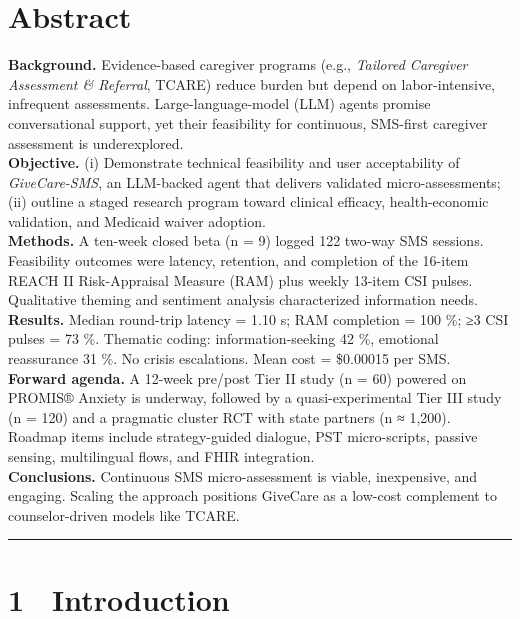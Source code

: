 \section{Abstract}\label{abstract}

\textbf{Background.} Evidence-based caregiver programs (e.g.,
\emph{Tailored Caregiver Assessment \& Referral}, TCARE) reduce burden
but depend on labor-intensive, infrequent assessments.
Large-language-model (LLM) agents promise conversational support, yet
their feasibility for continuous, SMS-first caregiver assessment is
underexplored.\\
\textbf{Objective.} (i) Demonstrate technical feasibility and user
acceptability of \emph{GiveCare-SMS}, an LLM-backed agent that delivers
validated micro-assessments; (ii) outline a staged research program
toward clinical efficacy, health-economic validation, and Medicaid
waiver adoption.\\
\textbf{Methods.} A ten-week closed beta (n = 9) logged 122 two-way SMS
sessions. Feasibility outcomes were latency, retention, and completion
of the 16-item REACH II Risk-Appraisal Measure (RAM) plus weekly 13-item
CSI pulses. Qualitative theming and sentiment analysis characterized
information needs.\\
\textbf{Results.} Median round-trip latency = 1.10 s; RAM completion =
100 \%; ≥3 CSI pulses = 73 \%. Thematic coding: information-seeking 42
\%, emotional reassurance 31 \%. No crisis escalations. Mean cost =
\$0.00015 per SMS.\\
\textbf{Forward agenda.} A 12-week pre/post Tier II study (n = 60)
powered on PROMIS® Anxiety is underway, followed by a quasi-experimental
Tier III study (n = 120) and a pragmatic cluster RCT with state partners
(n ≈ 1,200). Roadmap items include strategy-guided dialogue, PST
micro-scripts, passive sensing, multilingual flows, and FHIR
integration.\\
\textbf{Conclusions.} Continuous SMS micro-assessment is viable,
inexpensive, and engaging. Scaling the approach positions GiveCare as a
low-cost complement to counselor-driven models like TCARE.

\begin{center}\rule{0.5\linewidth}{0.5pt}\end{center}

\section{1 Introduction}\label{introduction}

